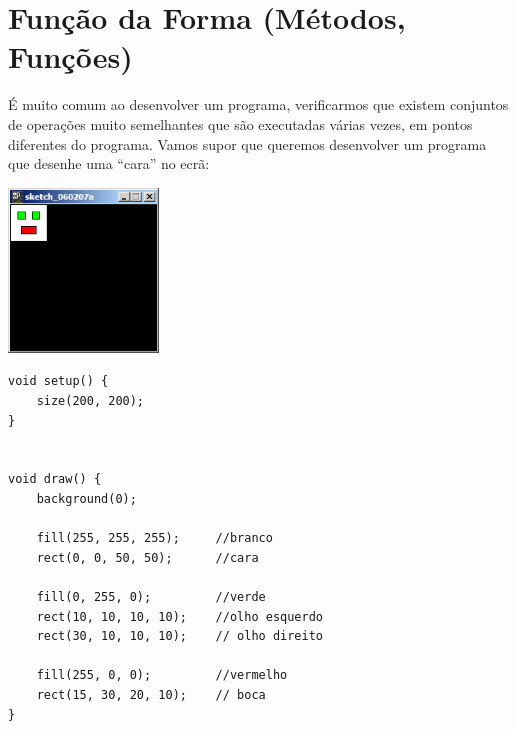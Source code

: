 \chapter{Função da Forma (Métodos, Funções)}\label{cap:metodos}


É muito comum ao desenvolver um programa, verificarmos que existem conjuntos de operações muito semelhantes
que são executadas várias vezes, em pontos diferentes do programa. 
Vamos supor que queremos desenvolver um programa que desenhe uma ``cara'' no ecrã:
\begin{center}
	\includegraphics[width=4cm]{images/cara.eps}
\end{center}
\begin{lstlisting}
void setup() {
    size(200, 200);
}


void draw() {
    background(0);
    
    fill(255, 255, 255);     //branco
    rect(0, 0, 50, 50);      //cara
    
    fill(0, 255, 0);         //verde
    rect(10, 10, 10, 10);    //olho esquerdo
    rect(30, 10, 10, 10);    // olho direito
    
    fill(255, 0, 0);         //vermelho
    rect(15, 30, 20, 10);    // boca
}
\end{lstlisting}

